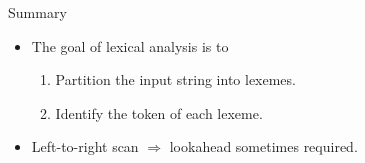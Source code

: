 \documentclass[11pt]{report}
\newenvironment{cell}{%
	\tcolorbox[blanker,breakable,left=5mm,
	before skip=10pt,after skip=10pt,
	borderline west={1mm}{0pt}{stanfordred}]
}%
{\endtcolorbox}
\begin{document}
\begin{cell}
    \textcolor{stanfordred}{Summary} 

    \begin{itemize}
        \item The goal of lexical analysis is to
        \begin{enumerate}
            \item Partition the input string into lexemes.
            \item Identify the token of each lexeme.
        \end{enumerate}
        \item Left-to-right scan \(\Rightarrow\) lookahead sometimes required.
    \end{itemize}
\end{cell}


    
\end{document}
